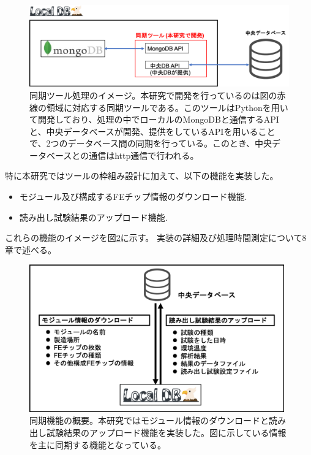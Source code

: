 \begin{figure}[bpt]\centering
\includegraphics[width=13cm]{./interfacing_tools_system.png}
\caption[同期ツール処理のイメージ]{同期ツール処理のイメージ。本研究で開発を行っているのは図の赤線の領域に対応する同期ツールである。このツールはPythonを用いて開発しており、処理の中でローカルのMongoDBと通信するAPIと、中央データベースが開発、提供をしているAPIを用いることで、2つのデータベース間の同期を行っている。このとき、中央データベースとの通信はhttp通信で行われる。}
\label{interfacing_tools_system}
\end{figure}

特に本研究ではツールの枠組み設計に加えて、以下の機能を実装した。
\begin{itemize}
  \item モジュール及び構成するFEチップ情報のダウンロード機能.
  \item 読み出し試験結果のアップロード機能.
\end{itemize}

これらの機能のイメージを図\ref{interface_overview}に示す。
実装の詳細及び処理時間測定について8章で述べる。

\begin{figure}[bpt]\centering
\includegraphics[width=11cm]{./interface_overview.png}
\caption[同期機能の概要]{同期機能の概要。本研究ではモジュール情報のダウンロードと読み出し試験結果のアップロード機能を実装した。図に示している情報を主に同期する機能となっている。}
\label{interface_overview}
\end{figure}

